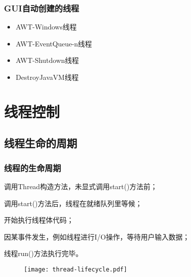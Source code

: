 \begin{frame}[fragile] %
  \frametitle{GUI自动创建的线程}
  
  \begin{itemize}[<+-| alert@+>]\kai
  \item {\hei AWT-Windows线程}\\
  \item {\hei AWT-EventQueue-n线程}\\
  \item {\hei AWT-Shutdown线程}\\
  \item {\hei DestroyJavaVM线程}\\
  \end{itemize}
\end{frame}

\section{线程控制}

\subsection{线程生命的周期}
\begin{frame}[fragile] %
  \frametitle{线程的生命周期}
  
  \begin{description}[<+-| alert@+>]\kai
  \item[新建状态] 调用Thread构造方法，未显式调用start()方法前；
  \item[就绪状态] 调用start()方法后，线程在就绪队列里等候；
  \item[运行状态] 开始执行线程体代码；
  \item[阻塞状态] 因某事件发生，例如线程进行I/O操作，等待用户输入数据；
  \item[终止状态] 线程run()方法执行完毕。
  \end{description}

\begin{figure}
\centering
\texttt{[image: thread-lifecycle.pdf]}
\end{figure}
\end{frame}

